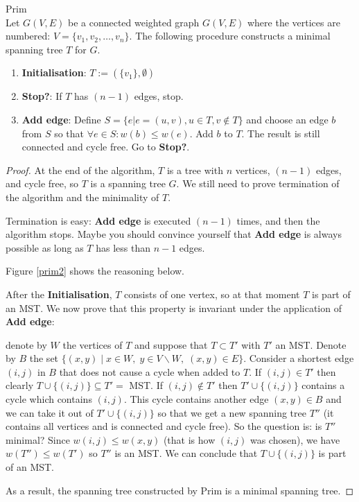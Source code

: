 \begin{code}Prim\label{prim} \\
  Let $G(V,E)$ be a connected weighted graph $G(V,E)$ where the
vertices are numbered: $V = \{v_{1},v_{2},\ldots,v_{n}\}$. The
following procedure constructs a minimal spanning tree $T$ for $G$.
\begin{enumerate}
\item \textbf{Initialisation}: $T := (\{v_{1}\},\emptyset)$
\item \textbf{Stop?}: If $T$ has $(n-1)$ edges, stop.
\item \textbf{Add edge}:
Define $S = \{e | e = (u,v), u \in T, v \notin T\}$ and choose an edge
$b$ from $S$ so that $\forall e \in S: w(b) \leq w(e)$. Add $b$ to
$T$. The result is still connected and cycle free.
Go to \textbf{Stop?}.
\end{enumerate}
\end{code}

\begin{proof}
At the end of the algorithm, $T$ is a tree with $n$ vertices,
$(n-1)$ edges, and cycle free, so $T$ is a spanning tree $G$. We still need to prove termination of the algorithm and the minimality of $T$.

Termination is easy: \textbf{Add edge} is executed $(n-1)$ times, and
then the algorithm stops. Maybe you should convince yourself that
\textbf{Add edge} is always possible as long as $T$ has less than
$n-1$ edges.

Figure \ref{prim2} shows the reasoning below.

After the \textbf{Initialisation}, $T$ consists of one vertex, so at
that moment $T$ is part of an MST. We now prove that this property
is invariant under the application of \textbf{Add edge}:

denote by $W$ the vertices of $T$ and suppose that $T \subset T'$ with
$T'$ an MST. Denote by $B$ the set
%
$\{(x,y)\;|\; x \in W,\; y \in V \backslash W,\; (x,y) \in E\}$.
%
Consider a shortest edge $(i,j)$ in $B$ that does not cause a cycle
when added to $T$. If $(i,j) \in T'$ then clearly $T \cup \{(i,j)\}
\subseteq T' = $ MST. If $(i,j) \notin T'$ then $T' \cup \{(i,j)\}$
contains a cycle which contains $(i,j)$.  This cycle contains another
edge $(x,y) \in B$ and we can take it out of $T' \cup \{(i,j)\}$ so
that we get a new spanning tree $T''$ (it contains all vertices and is
connected and cycle free). So the question is: is $T''$ minimal?
Since $w(i,j) \leq w(x,y)$ (that is how $(i,j)$ was chosen), we
have $w(T'') \leq w(T')$ so $T''$ is an MST. We can conclude that
$T \cup \{(i,j)\}$ is part of an MST.

As a result, the spanning tree constructed by Prim is a minimal
spanning tree.
\end{proof}

